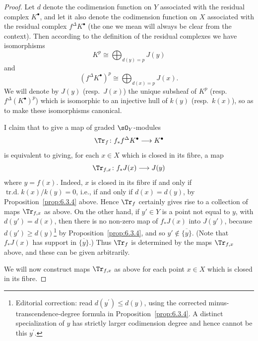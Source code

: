 \begin{proof}
\begingroup
\setlength{\emergencystretch}{2em}
Let $d$ denote the codimension function on $Y$ associated with the residual complex $K^{\bullet}$, and let it also denote the codimension function on $X$ associated with the residual complex $f^{\Delta}K^{\bullet}$ (the one we mean will always be clear from the context). Then according to the definition of the residual complexes we have isomorphisms
\[
K^{p} \cong \bigoplus_{d(y)=p} J(y)
\]
and
\[
(f^{\Delta}K^{\bullet})^{p} \cong \bigoplus_{d(x)=p} J(x).
\]
We will denote by $J(y)$ (resp.\ $J(x)$) the unique subsheaf of $K^{p}$ (resp.\ $f^{\Delta}(K^{\bullet})^{p}$) which is isomorphic to an injective hull of $k(y)$ (resp.\ $k(x)$), so as to make these isomorphisms canonical.

I claim that to give a map of graded $\sO_Y$-modules
\[
\Tr_f\colon f_*f^{\Delta}K^{\bullet} \longrightarrow K^{\bullet}
\]
is equivalent to giving, for each $x\in X$ which is closed in its fibre, a map
\[
\Tr_{f,x}\colon f_{*}J(x) \longrightarrow J(y)
\]
where $y=f(x)$. Indeed, $x$ is closed in its fibre if and only if $\operatorname{tr.d.} k(x)/k(y)=0$, i.e., if and only if $d(x)=d(y)$, by Proposition~\ref{prop:6.3.4} above. Hence $\Tr_f$ certainly gives rise to a collection of maps $\Tr_{f,x}$ as above. On the other hand, if $y'\in Y$ is a point not equal to $y$, with $d(y')=d(x)$, then there is no non-zero map of $f_*J(x)$ into $J(y')$, because $d(y')\geq d(y)$\footnote{Editorial correction: read $d(y^{\prime})\leq d(y)$, using the corrected minus-transcendence-degree formula in Proposition~\ref{prop:6.3.4}. A distinct specialization of $y$ has strictly larger codimension degree and hence cannot be this $y^{\prime}$.} by Proposition~\ref{prop:6.3.4}, and so $y'\notin\overline{\{y\}}$. (Note that $f_*J(x)$ has support in $\overline{\{y\}}$.) Thus $\Tr_f$ is determined by the maps $\Tr_{f,x}$ above, and these can be given arbitrarily.

We will now construct maps $\Tr_{f,x}$ as above for each point $x\in X$ which is closed in its fibre.


\end{proof}

